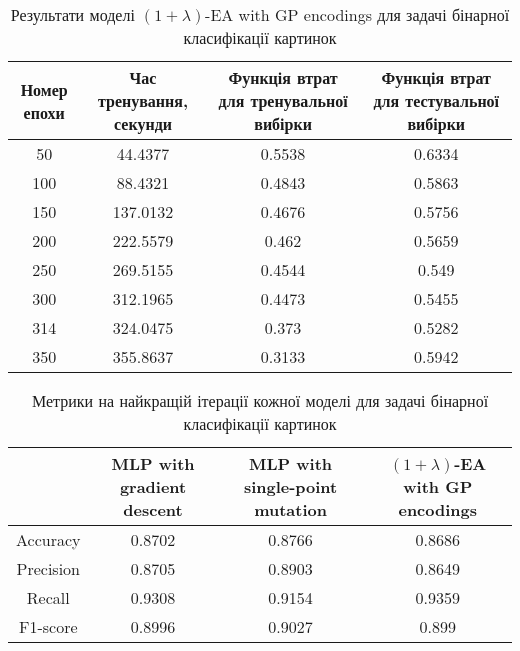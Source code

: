 \begin{table}[ht]
	\caption{Результати моделі $(1+\lambda)$-EA with GP encodings для задачі бінарної класифікації картинок}
	\label{ea_bc_id_results}
	\centering
	\begin{adjustbox}{max width=\textwidth}
		\begin{tabular}{|c|c|c|c|}
			\hline 
			Номер епохи & Час тренування, секунди & Функція втрат для тренувальної вибірки & Функція втрат для тестувальної вибірки \\
			\hline 
			50 & 44.4377 & 0.5538 & 0.6334 \\
			\hline 
			100 & 88.4321 & 0.4843 & 0.5863 \\
			\hline
			150 & 137.0132 & 0.4676 & 0.5756 \\
			\hline
			200 & 222.5579 & 0.462 & 0.5659 \\
			\hline
			250 & 269.5155 & 0.4544 & 0.549 \\
			\hline
			300 & 312.1965 & 0.4473 & 0.5455 \\
			\hline
			314 & 324.0475 & 0.373 & 0.5282 \\
			\hline
			350 & 355.8637 & 0.3133 & 0.5942 \\
			\hline
		\end{tabular}
	\end{adjustbox}
\end{table}

\begin{table}[ht]
	\caption{Метрики на найкращій ітерації кожної моделі для задачі бінарної класифікації картинок}
	\label{metrics_bc_id_results}
	\centering
	\begin{adjustbox}{max width=\textwidth}
		\begin{tabular}{|c|c|c|c|}
			\hline 
			& MLP with gradient descent & MLP with single-point mutation & $(1+\lambda)$-EA with GP encodings \\
			\hline 
			Accuracy & 0.8702 & 0.8766 & 0.8686 \\
			\hline 
			Precision & 0.8705 & 0.8903 & 0.8649 \\
			\hline
			Recall & 0.9308 & 0.9154 & 0.9359 \\
			\hline
			F1-score & 0.8996 & 0.9027 & 0.899 \\
			\hline
		\end{tabular}
	\end{adjustbox}
\end{table}

